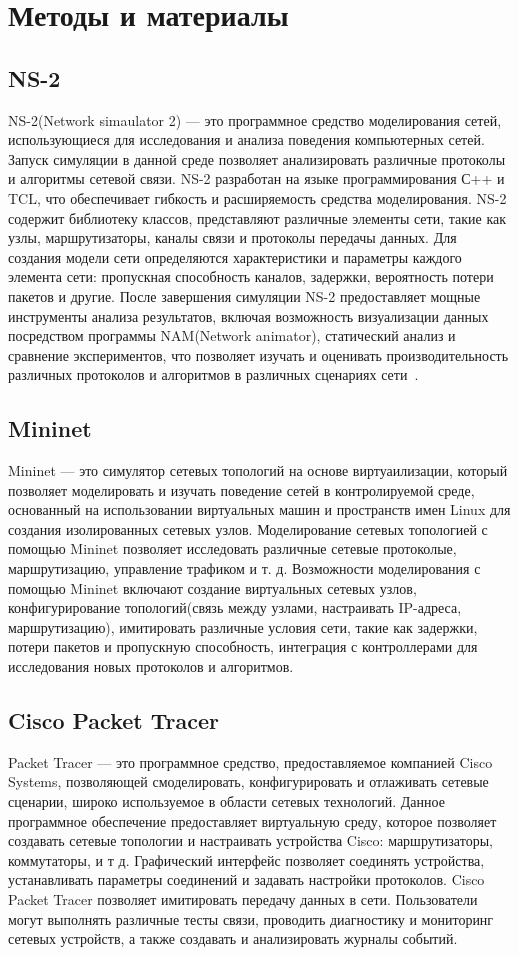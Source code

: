 \chapter{Методы и материалы}
\section{NS-2}
NS-2(Network simaulator 2) — это программное средство моделирования сетей, использующиеся 
для исследования и анализа поведения компьютерных сетей. 
Запуск симуляции в данной среде позволяет анализировать различные протоколы и алгоритмы сетевой связи. 
NS-2 разработан на языке программирования С++ и TCL, что обеспечивает гибкость и расширяемость средства моделирования. 
NS-2 содержит библиотеку классов, представляют различные элементы сети, такие как узлы, маршрутизаторы, каналы связи и протоколы передачы данных. Для создания модели сети определяются характеристики и параметры каждого элемента сети: пропускная способность каналов, задержки, вероятность потери пакетов и другие. После завершения симуляции NS-2 предоставляет мощные инструменты анализа результатов, включая возможность визуализации данных посредством программы NAM(Network animator), статический анализ и сравнение экспериментов, что позволяет изучать и оценивать производительность различных протоколов и алгоритмов в различных сценариях сети~\cite{The2011,Floyd1997}.

\section{Mininet}
Mininet — это симулятор сетевых топологий на основе виртуаилизации, который позволяет моделировать и изучать поведение сетей в контролируемой среде, основанный на использовании виртуальных машин и пространств имен Linux для создания изолированных сетевых узлов. Моделирование сетевых топологией с помощью Mininet позволяет исследовать различные сетевые протоколые, маршрутизацию, управление трафиком и т. д. Возможности моделирования с помощью Mininet включают создание виртуальных сетевых узлов, конфигурирование топологий(связь между узлами, настраивать IP-адреса, маршрутизацию), имитировать различные условия сети, такие как задержки, потери пакетов и пропускную способность, интеграция с контроллерами для исследования новых протоколов и алгоритмов.

\section{Cisco Packet Tracer}
Packet Tracer — это программное средство, предоставляемое компанией Cisco Systems, позволяющей смоделировать, конфигурировать и отлаживать сетевые сценарии, широко используемое в области сетевых технологий. Данное программное обеспечение предоставляет виртуальную среду, которое позволяет создавать сетевые топологии и настраивать устройства Cisco: маршрутизаторы, коммутаторы, и т д. Графический интерфейс позволяет соединять устройства, устанавливать параметры соединений и задавать настройки протоколов. Cisco Packet Tracer позволяет имитировать передачу данных в сети. Пользователи могут выполнять различные тесты связи, проводить диагностику и мониторинг сетевых устройств, а также создавать и анализировать журналы событий.


